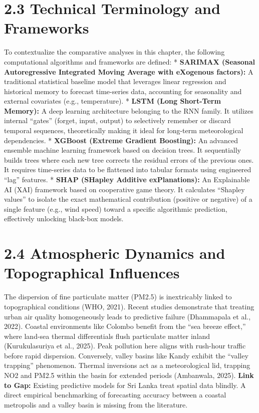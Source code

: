 \section{2.3 Technical Terminology and
Frameworks}\label{technical-terminology-and-frameworks}

To contextualize the comparative analyses in this chapter, the following
computational algorithms and frameworks are defined: * \textbf{SARIMAX
(Seasonal Autoregressive Integrated Moving Average with eXogenous
factors):} A traditional statistical baseline model that leverages
linear regression and historical memory to forecast time-series data,
accounting for seasonality and external covariates (e.g., temperature).
* \textbf{LSTM (Long Short-Term Memory):} A deep learning architecture
belonging to the RNN family. It utilizes internal ``gates'' (forget,
input, output) to selectively remember or discard temporal sequences,
theoretically making it ideal for long-term meteorological dependencies.
* \textbf{XGBoost (Extreme Gradient Boosting):} An advanced ensemble
machine learning framework based on decision trees. It sequentially
builds trees where each new tree corrects the residual errors of the
previous ones. It requires time-series data to be flattened into tabular
formats using engineered ``lag'' features. * \textbf{SHAP (SHapley
Additive exPlanations):} An Explainable AI (XAI) framework based on
cooperative game theory. It calculates ``Shapley values'' to isolate the
exact mathematical contribution (positive or negative) of a single
feature (e.g., wind speed) toward a specific algorithmic prediction,
effectively unlocking black-box models.

\section{2.4 Atmospheric Dynamics and Topographical
Influences}\label{atmospheric-dynamics-and-topographical-influences}

The dispersion of fine particulate matter (PM2.5) is inextricably linked
to topographical conditions (WHO, 2021). Recent studies demonstrate that
treating urban air quality homogeneously leads to predictive failure
(Dhammapala et al., 2022). Coastal environments like Colombo benefit
from the ``sea breeze effect,'' where land-sea thermal differentials
flush particulate matter inland (Kurukulasuriya et al., 2025). Peak
pollution here aligns with rush-hour traffic before rapid dispersion.
Conversely, valley basins like Kandy exhibit the ``valley trapping''
phenomenon. Thermal inversions act as a meteorological lid, trapping NO2
and PM2.5 within the basin for extended periods (Ambanwala, 2025).
\textbf{Link to Gap:} Existing predictive models for Sri Lanka treat
spatial data blindly. A direct empirical benchmarking of forecasting
accuracy between a coastal metropolis and a valley basin is missing from
the literature.

